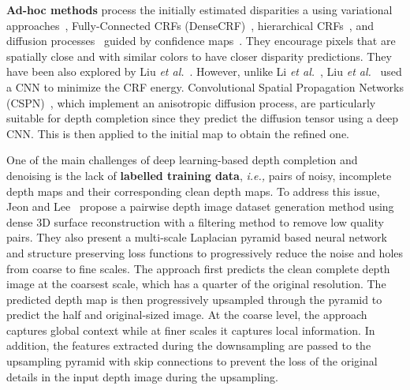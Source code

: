 \documentclass[10pt,journal,compsoc]{IEEEtran}
\newcommand{\ie}{\emph{i.e., }}
\newcommand{\etal}{\emph{et al.}}
\begin{document}
\textbf{Ad-hoc methods} process the initially estimated disparities a  using variational approaches~\cite{dosovitskiy2015flownet,brox2011large}, Fully-Connected CRFs (DenseCRF)~\cite{huang2018deepmvs,krahenbuhl2011efficient},  hierarchical CRFs~\cite{li2015depth}, and diffusion processes~\cite{chen2015deep} guided by confidence maps~\cite{sun2014real}.  They encourage pixels that are spatially close and with similar colors to have closer disparity predictions.   They have been also explored by Liu \etal~\cite{liu2016learning}. However, unlike Li \etal~\cite{li2015depth},  Liu \etal~\cite{liu2016learning}  used a CNN to minimize the CRF energy.  Convolutional Spatial Propagation Networks (CSPN)~\cite{liu2017learningaffinity,cheng2018learning}, which implement an anisotropic diffusion process,  are particularly suitable for depth completion since they predict the diffusion tensor using a deep CNN. This is then applied to the initial  map to obtain the refined one.  

One of the main challenges of deep learning-based depth completion and denoising is the lack of \textbf{labelled training data}, \ie pairs of noisy, incomplete depth maps and their corresponding clean depth maps. To address this issue, Jeon and Lee~\cite{Jeon_2018_ECCV} propose a pairwise depth image dataset generation method using dense 3D surface reconstruction
with a filtering method to remove low quality pairs. They also present a multi-scale Laplacian pyramid based neural network and structure preserving loss functions to progressively reduce the noise and holes from coarse to fine scales. The approach first predicts the clean complete depth image at the coarsest scale, which has a quarter of the original resolution. The predicted  depth map  is then progressively upsampled through the pyramid to predict the half and original-sized image.   At the coarse level, the approach captures global context while at finer scales it captures local information.  In addition, the features extracted during the downsampling are passed to the upsampling pyramid with skip connections to prevent the loss of the original details in the input depth image during the upsampling.
\end{document}

